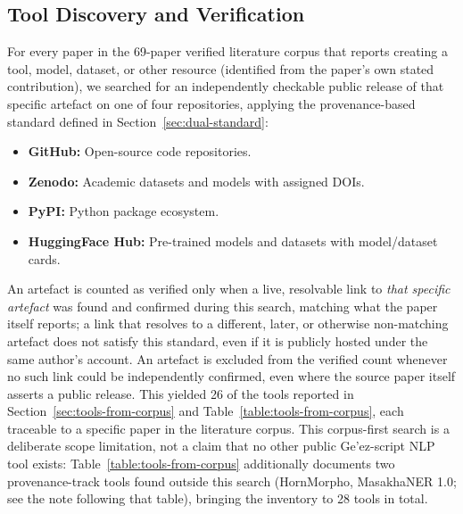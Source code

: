 \documentclass[sn-mathphys-num]{sn-jnl}
\theoremstyle{thmstyleone}
\theoremstyle{thmstyletwo}
\theoremstyle{thmstylethree}
\begin{document}
\subsection{Tool Discovery and Verification}\label{sec:tool-discovery}

For every paper in the 69-paper verified literature corpus that reports creating a tool, model, dataset, or other resource (identified from the paper's own stated contribution), we searched for an independently checkable public release of that specific artefact on one of four repositories, applying the provenance-based standard defined in Section~\ref{sec:dual-standard}:

\begin{itemize}
    \item \textbf{GitHub:} Open-source code repositories.
    \item \textbf{Zenodo:} Academic datasets and models with assigned DOIs.
    \item \textbf{PyPI:} Python package ecosystem.
    \item \textbf{HuggingFace Hub:} Pre-trained models and datasets with model/dataset cards.
\end{itemize}

\noindent An artefact is counted as verified only when a live, resolvable link to \emph{that specific artefact} was found and confirmed during this search, matching what the paper itself reports; a link that resolves to a different, later, or otherwise non-matching artefact does not satisfy this standard, even if it is publicly hosted under the same author's account. An artefact is excluded from the verified count whenever no such link could be independently confirmed, even where the source paper itself asserts a public release. This yielded 26 of the tools reported in Section~\ref{sec:tools-from-corpus} and Table~\ref{table:tools-from-corpus}, each traceable to a specific paper in the literature corpus. This corpus-first search is a deliberate scope limitation, not a claim that no other public Ge'ez-script NLP tool exists: Table~\ref{table:tools-from-corpus} additionally documents two provenance-track tools found outside this search (HornMorpho, MasakhaNER 1.0; see the note following that table), bringing the inventory to 28 tools in total.
\end{document}
